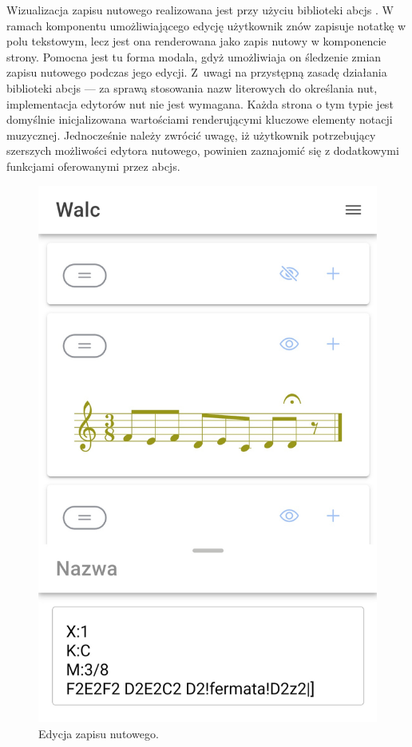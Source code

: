 Wizualizacja zapisu nutowego realizowana jest przy użyciu biblioteki abcjs \cite{abcjs}. W ramach komponentu umożliwiającego edycję
użytkownik znów zapisuje notatkę w polu tekstowym, lecz jest ona renderowana jako zapis nutowy w komponencie strony.
Pomocna jest tu forma modala,
gdyż umożliwiaja on śledzenie zmian zapisu nutowego podczas jego edycji. Z~uwagi na przystępną zasadę działania biblioteki
abcjs — za sprawą stosowania nazw literowych do określania nut, implementacja edytorów nut nie jest wymagana.
Każda strona o tym typie jest domyślnie inicjalizowana wartościami renderującymi kluczowe elementy notacji muzycznej.
Jednocześnie należy zwrócić uwagę, iż użytkownik potrzebujący szerszych możliwości edytora nutowego, powinien zaznajomić
się z dodatkowymi funkcjami oferowanymi przez abcjs.

\begin{figure}[H]
	\begin{center}
		\includegraphics[scale=0.12]{media/ScoreEditor.jpg}
	\end{center}
	\caption{Edycja zapisu nutowego.}
	\label{rys:score-editor}
\end{figure}

